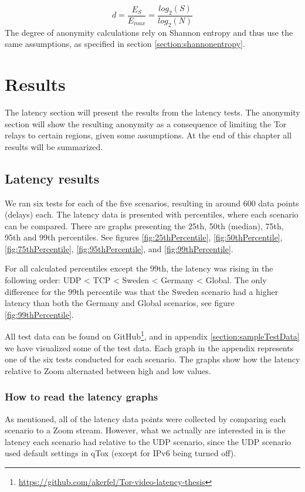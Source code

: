 \documentclass{kththesis}
\begin{document}
\[d = \frac{E_{S}}{E_{max}} = \frac{log_{2}(S)}{log_{2}(N)}\]
The degree of anonymity calculations rely on Shannon entropy and thus use the same assumptions, as specified in section \ref{section:shannonentropy}.

\chapter{Results}
The latency section will present the results from the latency tests. The anonymity section will show the resulting anonymity as a consequence of limiting the Tor relays to certain regions, given some assumptions. At the end of this chapter all results will be summarized.

\section{Latency results}
We ran six tests for each of the five scenarios, resulting in around 600 data points (delays) each. The latency data is presented with percentiles, where each scenario can be compared. There are graphs presenting the 25th, 50th (median), 75th, 95th and 99th percentiles. See figures \ref{fig:25thPercentile}, \ref{fig:50thPercentile}, \ref{fig:75thPercentile}, \ref{fig:95thPercentile}, and \ref{fig:99thPercentile}.

For all calculated percentiles except the 99th, the latency was rising in the following order: UDP < TCP < Sweden < Germany < Global. The only difference for the 99th percentile was that the Sweden scenario had a higher latency than both the Germany and Global scenarios, see figure \ref{fig:99thPercentile}.

All test data can be found on GitHub\footnote{\url{https://github.com/akerfel/Tor-video-latency-thesis}}, and in appendix \ref{section:sampleTestData} we have visualized some of the test data. Each graph in the appendix represents one of the six tests conducted for each scenario. The graphs show how the latency relative to Zoom alternated between high and low values.

\subsection{How to read the latency graphs}
As mentioned, all of the latency data points were collected by comparing each scenario to a Zoom stream. However, what we actually are interested in is the latency each scenario had relative to the UDP scenario, since the UDP scenario used default settings in qTox (except for IPv6 being turned off). 
\end{document}
